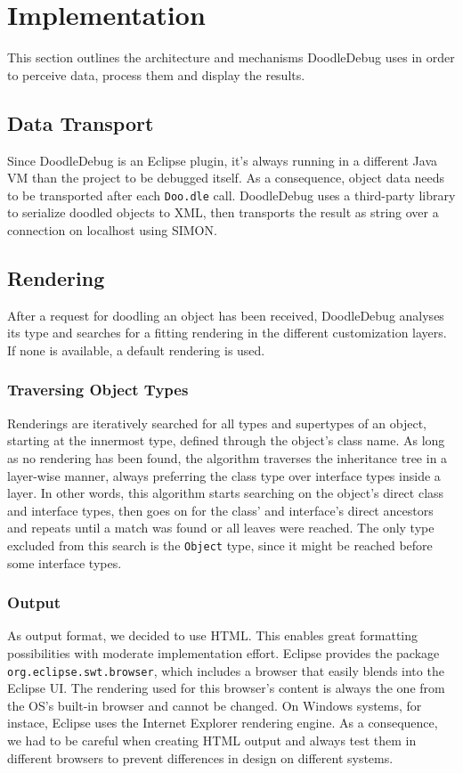 \documentclass[english]{scrartcl}
\newcommand{\DD}{Dood\-le\-De\-bug\xspace}
\newcommand{\Doodle}{\texttt{Doo.\-dle}\xspace}
\begin{document}
\section{Implementation}
This section outlines the architecture and mechanisms \DD uses in order to perceive data, process them and display the results.

\subsection{Data Transport}
Since \DD is an Eclipse plugin, it's always running in a different Java VM than the project to be debugged itself.
As a consequence, object data needs to be transported after each \Doodle call.
\DD uses a third-party library\cite{xstream} to serialize doodled objects to XML, then transports the result as string over a connection on localhost using SIMON\cite{simon}.

\subsection{Rendering}
After a request for doodling an object has been received, \DD analyses its type and searches for a fitting rendering in the different customization layers.
If none is available, a default rendering is used.

\subsubsection{Traversing Object Types}
Renderings are iteratively searched for all types and supertypes of an object, starting at the innermost type, defined through the object's class name.
As long as no rendering has been found, the algorithm traverses the inheritance tree in a layer-wise manner, always preferring the class type over interface types inside a layer.
In other words, this algorithm starts searching on the object's direct class and interface types, then goes on for the class' and interface's direct ancestors and repeats until a match was found or all leaves were reached.
The only type excluded from this search is the \texttt{Object} type, since it might be reached before some interface types.

\subsubsection{Output}
As output format, we decided to use HTML.
This enables great formatting possibilities with moderate implementation effort.
Eclipse provides the package \texttt{org.eclipse.swt.browser}, which includes a browser that easily blends into the Eclipse UI.
The rendering used for this browser's content is always the one from the OS's built-in browser and cannot be changed.
On Windows systems, for instace, Eclipse uses the Internet Explorer rendering engine.
As a consequence, we had to be careful when creating HTML output and always test them in different browsers to prevent differences in design on different systems.
\end{document}
